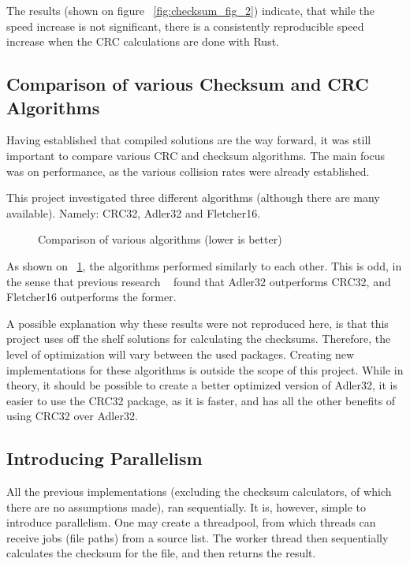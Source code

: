 The results (shown on figure ~\ref{fig:checksum_fig_2}) indicate,
that while the speed increase is not significant,
there is a consistently reproducible speed increase when the CRC calculations are done with Rust.


\subsection{Comparison of various Checksum and CRC Algorithms}

Having established that compiled solutions are the way forward, it was still important to compare various CRC and checksum algorithms.
The main focus was on performance, as the various collision rates were already established.

This project investigated three different algorithms (although there are many available).
Namely:
CRC32, Adler32 and Fletcher16.

\begin{figure}[H]
    \centering
    \begin{bchart}[step=50,max=400, unit=s]
        \medskip
        \medskip
    \end{bchart}
    \caption{Comparison of various algorithms (lower is better)}
    \label{fig:checksum_fig_3}
\end{figure}

As shown on ~\ref{fig:checksum_fig_3}, the algorithms performed similarly to each other.
This is odd, in the sense that previous research ~\cite{MaxinoChecksum} found that Adler32 outperforms CRC32,
and Fletcher16 outperforms the former.

A possible explanation why these results were not reproduced here, is that this project uses off the shelf
solutions for calculating the checksums.
Therefore, the level of optimization will vary between the used packages.
Creating new implementations for these algorithms is outside the scope of this project.
While in theory, it should be possible to create a better optimized version of Adler32, it is easier
to use the CRC32 package, as it is faster, and has all the other benefits of using CRC32 over Adler32.

\subsection{Introducing Parallelism}
All the previous implementations (excluding the checksum calculators, of which there are no assumptions made),
ran sequentially.
It is, however, simple to introduce parallelism.
One may create a threadpool, from which threads can receive jobs (file paths) from a source list.
The worker thread then sequentially calculates the checksum for the file, and then returns the result.

